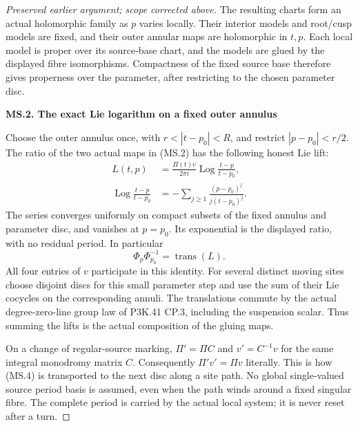 \begin{proof}[Preserved earlier argument; scope corrected above]
The resulting charts form an actual holomorphic family as \(p\)
varies locally. Their interior models and root/cusp models are fixed,
and their outer annular maps are holomorphic in \(t,p\). Each local model is proper over its source-base chart, and the
models are glued by the displayed fibre isomorphisms. Compactness of
the fixed source base therefore gives properness over the parameter,
after restricting to the chosen parameter disc.

\par

\medskip\noindent\textbf{MS.2. The exact Lie logarithm on a fixed outer annulus}

\par\nobreak

Choose the outer annulus once, with
\(r<|t-p_0|<R\), and restrict \(|p-p_0|<r/2\). The ratio of
the two actual maps in (MS.2) has the following honest Lie lift:
\[
 \begin{split}
 L(t,p)&=\frac{\Pi(t)v}{2\pi i}
                   \operatorname{Log}\frac{t-p}{t-p_0},\\
 \operatorname{Log}\frac{t-p}{t-p_0}
       &=-\sum_{j\geq1}\frac{(p-p_0)^j}{j(t-p_0)^j}.
 \end{split}                                             \tag{MS.4}
\]
The series converges uniformly on compact subsets of the fixed annulus
and parameter disc, and vanishes at \(p=p_0\). Its exponential is
the displayed ratio, with no residual period. In particular
\[
       \Phi_p\Phi_{p_0}^{-1}=\operatorname{trans}(L).      \tag{MS.5}
\]
All four entries of \(v\) participate in this identity. For several
distinct moving sites choose disjoint discs for this small parameter
step and use the sum of their Lie cocycles on the corresponding
annuli. The translations commute by the actual degree-zero-line group
law of P3K.41 CP.3, including the suspension scalar. Thus summing the
lifts is the actual composition of the gluing maps.

On a change of regular-source marking, \(\Pi' =\Pi C\) and
\(v'=C^{-1}v\) for the same integral monodromy matrix \(C\).
Consequently \(\Pi'v'=\Pi v\) literally. This is how (MS.4)
is transported to the next disc along a site path. No global
single-valued source period basis is assumed, even when the path
winds around a fixed singular fibre. The complete period is carried
by the actual local system; it is never reset after a turn.

\par


\end{proof}
